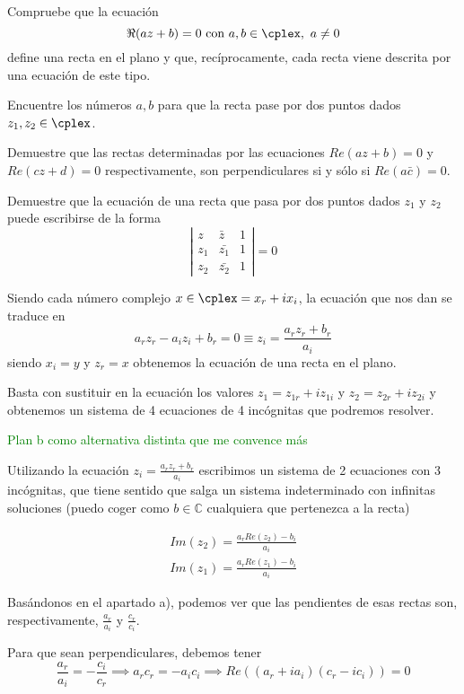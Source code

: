 \begin{problem}[15]

\ppart
Compruebe que la ecuación
\[\Re (az+b) = 0 \text{ con } a,b\in \cplex, \ a \neq 0\]
define una recta en el plano y que, recíprocamente, cada recta viene descrita por una ecuación de este tipo.

\ppart
Encuentre los números $a,b$ para que la recta pase por dos puntos dados $z_1, z_2 \in \cplex$.

\ppart
Demuestre que las rectas determinadas por las ecuaciones $Re(az+b)=0$ y $Re(cz+d)=0$ respectivamente, son perpendiculares si y sólo si $Re(a\bar{c})=0$.

\ppart
Demuestre que la ecuación de una recta que pasa por dos puntos dados $z_1$ y $z_2$ puede escribirse de la forma
\[ \left| \begin{array}{ccc}
z  & \bar{z} & 1 \\
z_1 & \bar{z_1}&  1 \\
z_2 & \bar{z_2} & 1 \end{array} \right| = 0\]

\solution
{}

\spart

Siendo cada número complejo $x\in \cplex = x_r+ix_i$, la ecuación que nos dan se traduce en
\[a_rz_r-a_iz_i+b_r=0 \equiv z_i = \frac{a_rz_r+b_r}{a_i}\]
siendo $x_i = y$ y $z_r = x$ obtenemos la ecuación de una recta en el plano.

\spart

Basta con sustituir en la ecuación los valores $z_1=z_{1r}+iz_{1i}$ y $z_2=z_{2r}+iz_{2i}$ y obtenemos un sistema de 4 ecuaciones de 4 incógnitas que podremos resolver.

\textcolor{green}{Plan b como alternativa distinta que me convence más}

Utilizando la ecuación $z_i = \displaystyle\frac{a_rz_r+b_r}{a_i}$ escribimos un sistema de 2 ecuaciones con 3 incógnitas, que tiene sentido que salga un sistema indeterminado con infinitas soluciones (puedo coger como $b∈ℂ$ cualquiera que pertenezca a la recta)

\[
\begin{array}{cc}
Im(z_2) = \frac{a_r Re(z_2) - b_i}{a_i}\\
Im(z_1) = \frac{a_r Re(z_1) - b_i}{a_i}
\end{array}
\]

\spart

Basándonos en el apartado a), podemos ver que las pendientes de esas rectas son, respectivamente, $\frac{a_r}{a_i}$ y $\frac{c_r}{c_i}$.

Para que sean perpendiculares, debemos tener
\[\frac{a_r}{a_i}= - \frac{c_i}{c_r} \implies a_rc_r = -a_ic_i \implies Re\left((a_r+ia_i)(c_r-ic_i)\right) = 0\]

\spart

\end{problem}

